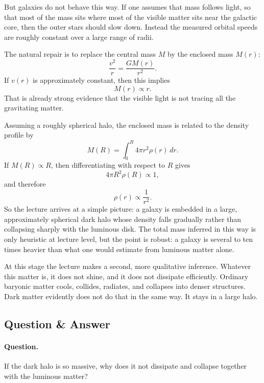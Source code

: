 But galaxies do not behave this way. If one assumes that mass follows light, so that most of the mass sits where most of the visible matter sits near the galactic core, then the outer stars should slow down. Instead the measured orbital speeds are roughly constant over a large range of radii.

The natural repair is to replace the central mass \(M\) by the enclosed mass \(M(r)\):
\begin{equation}
\frac{v^2}{r}=\frac{G M(r)}{r^2}.
\end{equation}
If \(v(r)\) is approximately constant, then this implies
\begin{equation}
M(r)\propto r.
\end{equation}
That is already strong evidence that the visible light is not tracing all the gravitating matter.

Assuming a roughly spherical halo, the enclosed mass is related to the density profile by
\begin{equation}
M(R)=\int_0^R 4\pi r^2 \rho(r)\,dr.
\end{equation}
If \(M(R)\propto R\), then differentiating with respect to \(R\) gives
\begin{equation}
4\pi R^2 \rho(R) \propto 1,
\end{equation}
and therefore
\begin{equation}
\rho(r)\propto \frac{1}{r^2}.
\end{equation}
So the lecture arrives at a simple picture: a galaxy is embedded in a large, approximately spherical dark halo whose density falls gradually rather than collapsing sharply with the luminous disk. The total mass inferred in this way is only heuristic at lecture level, but the point is robust: a galaxy is several to ten times heavier than what one would estimate from luminous matter alone.

At this stage the lecture makes a second, more qualitative inference. Whatever this matter is, it does not shine, and it does not dissipate efficiently. Ordinary baryonic matter cools, collides, radiates, and collapses into denser structures. Dark matter evidently does not do that in the same way. It stays in a large halo.

\subsection{Question \& Answer}

\paragraph{Question.} If the dark halo is so massive, why does it not dissipate and collapse together with the luminous matter?

